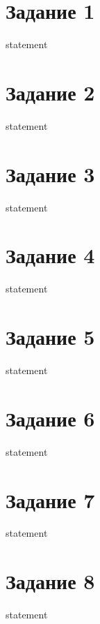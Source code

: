 \section{Задание 1}

{statement}

\section{Задание 2}

{statement}

\section{Задание 3}

{statement}

\section{Задание 4}

{statement}

\section{Задание 5}

{statement}

\section{Задание 6}

{statement}

\section{Задание 7}

{statement}

\section{Задание 8}

{statement}